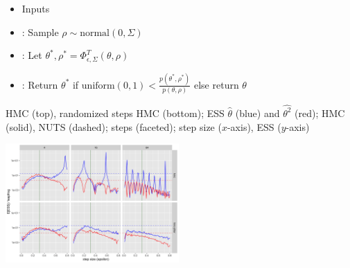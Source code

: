 \documentclass[10pt]{report}
\begin{document}
\begin{itemize}
\item Inputs
\item {}: Sample $\rho \sim \textrm{normal}(0, \Sigma)$
\item {}:  Let $\theta^*, \rho^* = \Phi_{\epsilon,\Sigma}^T(\theta, \rho)$
\item {}: Return $\theta^*$ if $\textrm{uniform}(0, 1) <
  \frac{\displaystyle p(\theta^*, \rho^*)}
       {\displaystyle p(\theta, \rho)}$ else return $\theta$
\end{itemize}

\begin{subitemize}
  \item HMC (top), randomized steps HMC (bottom); ESS
    $\widehat{\theta}$ (blue) and $\widehat{\theta^2}$ (red); HMC (solid),
    NUTS (dashed); steps (faceted); step size ($x$-axis), ESS ($y$-axis)
\end{subitemize}
\vspace*{-3pt}
\begin{center}
  \includegraphics[width=2.6in]{img/hmc-harmonics.png}
\end{center}
\end{document}
